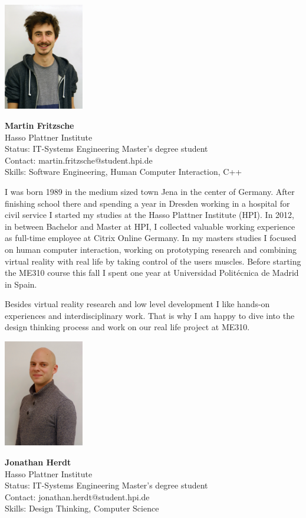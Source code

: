\vspace{0.5em}
\noindent \includegraphics[width=35mm]{Figures/People/martin}
\hspace{0.5em}\parbox[b]{0.6\textwidth}{\textbf{Martin Fritzsche}\\
Hasso Plattner Institute\\
Status: IT-Systems Engineering Master's degree student\\
Contact: martin.fritzsche@student.hpi.de\\
Skills: Software Engineering, Human Computer Interaction, C++\\
}

I was born 1989 in the medium sized town Jena in the center of Germany. After finishing school there and spending a year in Dresden working in a hospital for civil service I started my studies at the Hasso Plattner Institute (HPI). In 2012, in between Bachelor and Master at HPI, I collected valuable working experience as full-time employee at Citrix Online Germany. In my masters studies I focused on human computer interaction, working on prototyping research and combining virtual reality with real life by taking control of the users muscles. Before starting the ME310 course this fall I spent one year at Universidad Politécnica de Madrid in Spain.

Besides virtual reality research and low level development I like hands-on experiences and interdisciplinary work. That is why I am happy to dive into the design thinking process and work on our real life project at ME310.

\vspace{2em}
\noindent \includegraphics[width=35mm]{Figures/People/Jonathan}
\hspace{0.5em}\parbox[b]{0.6\textwidth}{\textbf{Jonathan Herdt}\\
Hasso Plattner Institute\\
Status: IT-Systems Engineering Master's degree student\\
Contact: jonathan.herdt@student.hpi.de\\
Skills: Design Thinking, Computer Science\\
}

